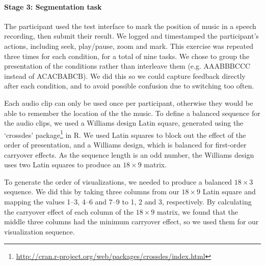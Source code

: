 \paragraph{Stage 3: Segmentation task}
The participant used the test interface to mark the position of music in a speech recording, then submit their result.
We logged and timestamped the participant's actions, including seek, play/pause, zoom and mark.  This exercise was
repeated three times for each condition, for a total of nine tasks.  We chose to group the presentation of the
conditions rather than interleave them (e.g. AAABBBCCC instead of ACACBABCB).  We did this so we could capture feedback
directly after each condition, and to avoid possible confusion due to switching too often.

Each audio clip can only be used once per participant, otherwise they would be able to remember the location of the the
music. To define a balanced sequence for the audio clips, we used a Williams design Latin square, generated using the
`crossdes' package\footnote{\url{http://cran.r-project.org/web/packages/crossdes/index.html}} in R.  We used Latin
squares to block out the effect of the order of presentation, and a Williams design, which is balanced for first-order
carryover effects.  As the sequence length is an odd number, the Williams design uses two Latin squares to produce an
$18\times9$ matrix.

To generate the order of visualizations, we needed to produce a balanced $18\times3$ sequence. We did this by taking
three columns from our $18\times9$ Latin square and mapping the values 1--3, 4--6 and 7--9 to 1, 2 and 3, respectively.
By calculating the carryover effect of each column of the $18\times9$ matrix, we found that the middle three columns
had the minimum carryover effect, so we used them for our visualization sequence.

